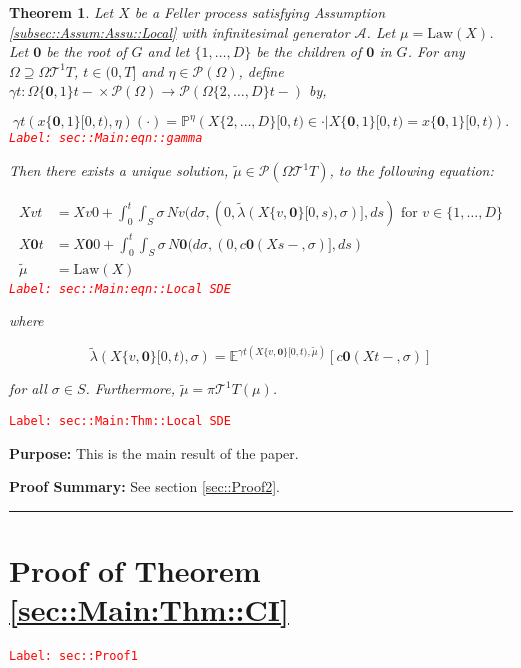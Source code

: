 \documentclass[12pt]{article}
\newcommand{\mb}{\mathbb}
\newcommand{\mc}{\mathcal}
\newcommand{\ra}{\rightarrow}
\newcommand{\te}{\text}
\newcommand{\tr}{\textcolor{red}}
\newcommand{\labe}[1]{\tr{\texttt{Label: #1}}}
\newcommand{\purpose}{\textbf{Purpose: }}
\newcommand{\pfsum}{\textbf{Proof Summary: }}
\newcommand{\lin}{\rule{\linewidth}{0.4 pt}}
\newcommand{\pr}{\mb{P}}							%
\newcommand{\exmu}[2]{\mb{E}^{#1}\left[#2\right]}	%
\newcommand{\pmsr}{\mc{P}}							%
\renewcommand{\root}{\mathbf{0}}				%
\renewcommand{\v}{v}							%
\renewcommand{\S}{S}							%
\newcommand{\s}{\sigma}							%
\newcommand{\T}{T}								%
\newcommand{\x}{x}								%
\renewcommand{\t}{t}							%
\newcommand{\proj}{\pi}							%
\renewcommand{\tt}{s}							%
\newcommand{\X}{X}								%
\newcommand{\IG}{\mc{A}}						%
\newcommand{\IGr}{c}							%
\newcommand{\degr}{D}							%
\newcommand{\tree}{\mc{T}}						%
\newcommand{\sln}[1]{^{#1}}						%
\newcommand{\poiss}{N}							%
\newcommand{\alt}[1]{\widetilde{#1}}			%
\newcommand{\m}{\mu}							%
\newcommand{\mmm}{\eta}							%
\newcommand{\cm}{\gamma}						%
\newcommand{\law}{\te{Law}}						%
\newcommand{\crate}{\alt{\lambda}}				%
\newtheorem{thms}{Theorem}[section]
\begin{document}
\begin{thms}
Let \(\X{}{}\) be a Feller process satisfying Assumption \ref{subsec::Assum:Assu::Local} with infinitesimal generator \(\IG\). Let \(\m{}{}{} = \law(\X{}{})\). Let \(\root\) be the root of \(G\) and let \(\{1,\dots,\degr\}\) be the children of \(\root\) in \(G\). For any \(\Omega \supseteq\Omega{\tree\sln{1}}{\T}\), \(\t\in (0,\T]\) and \(\mmm{}{}{} \in \pmsr(\Omega)\), define \(\cm{\t}:\Omega{\{\root,1\}}{\t-}\times \pmsr(\Omega) \ra \pmsr(\Omega{\{2,\dots,\degr\}}{\t-})\) by,

\begin{equation}
\cm{\t}(\x{\{\root,1\}}{[0,\t)},\mmm{}{}{})(\cdot) = \pr^{\mmm{}{}{}}\left(\X{\{2,\dots,\degr\}}{[0,\t)} \in \cdot|\X{\{\root,1\}}{[0,\t)} = \x{\{\root,1\}}{[0,\t)}\right).
\label{sec::Main:eqn::gamma}
\end{equation}
\labe{sec::Main:eqn::gamma}

Then there exists a unique solution, \(\alt{\m{}{}{}} \in \pmsr(\Omega{\tree\sln{1}}{\T})\), to the following equation:

\begin{align}
\X{\v}{\t} &= \X{\v}{0} + \int_0^\t\int_\S \s\,\poiss{\v}(d\s,(0,\crate{}(\X{\{\v,\root\}}{[0,\tt)},\s)],d\tt) \te{ for } \v \in \{1,\dots,\degr\}\nonumber\\
\X{\root}{\t} &= \X{\root}{0} + \int_0^\t\int_\S \s\,\poiss{\root}(d\s,(0,\IGr{\root}(\X{}{\tt-},\s)],d\tt)\nonumber\\
\alt{\m{}{}{}} &= \law(\X{}{})
\label{sec::Main:eqn::Local SDE}
\end{align}
\labe{sec::Main:eqn::Local SDE}

where

\[\crate{}(\X{\{\v,\root\}}{[0,\t)},\s) = \exmu{\cm{\t}(\X{\{\v,\root\}}{[0,\t)},\alt{\m{}{}{}})}{\IGr{\root}(\X{}{\t-},\s)}\]

for all \(\s\in \S\). Furthermore, \(\alt{\m{}{}{}} = \proj{\tree\sln{1}}{\T}(\m{}{}{})\).
\label{sec::Main:Thm::Local SDE}
\end{thms}
\labe{sec::Main:Thm::Local SDE}

\purpose This is the main result of the paper. 

\pfsum See section \ref{sec::Proof2}.

\lin

\section{Proof of Theorem \ref{sec::Main:Thm::CI}}
\label{sec::Proof1}\labe{sec::Proof1}
\end{document}
